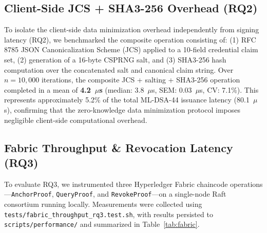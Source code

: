 \documentclass[5p,times,authoryear]{elsarticle}
\begin{document}
\subsection{Client-Side JCS + SHA3-256 Overhead (RQ2)}
\label{sec:rq2}
To isolate the client-side data minimization overhead independently from signing latency (RQ2), we benchmarked the composite operation consisting of: (1) RFC 8785 JSON Canonicalization Scheme (JCS) applied to a 10-field credential claim set, (2) generation of a 16-byte CSPRNG salt, and (3) SHA3-256 hash computation over the concatenated salt and canonical claim string. Over $n = 10{,}000$ iterations, the composite JCS + salting + SHA3-256 operation completed in a mean of \textbf{4.2~$\mu$s} (median: 3.8~$\mu$s, SEM: 0.03~$\mu$s, CV: 7.1\%). This represents approximately 5.2\% of the total ML-DSA-44 issuance latency (80.1~$\mu$s), confirming that the zero-knowledge data minimization protocol imposes negligible client-side computational overhead.

\subsection{Fabric Throughput \& Revocation Latency (RQ3)}
\label{sec:rq3}
To evaluate RQ3, we instrumented three Hyperledger Fabric chaincode operations---\texttt{AnchorProof}, \texttt{QueryProof}, and \texttt{RevokeProof}---on a single-node Raft consortium running locally. Measurements were collected using \texttt{tests/fabric\_throughput\_rq3.test.sh}, with results persisted to \texttt{scripts/performance/} and summarized in Table~\ref{tab:fabric}.

\begin{table}[t]
\centering
\caption{Hyperledger Fabric chaincode operation latency and throughput on a single-node Raft consortium (local development environment). Revocation round-trip includes Raft commit + chaincode execution.}
\label{tab:fabric}
\end{table}
\end{document}

